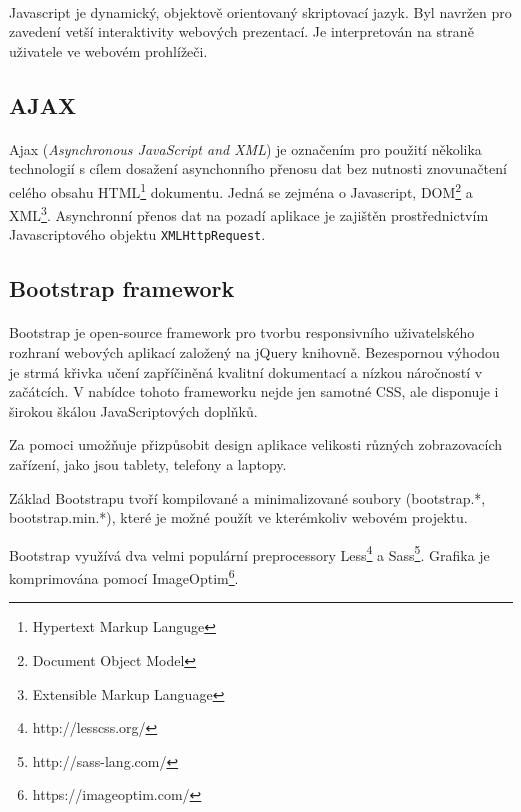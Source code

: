 \documentclass[11pt,oneside]{fithesis}
\begin{document}
        \paragraph*{}
        Javascript je dynamický, objektově orientovaný skriptovací jazyk. Byl navržen pro zavedení vetší interaktivity webových prezentací. Je interpretován na straně uživatele ve webovém prohlížeči.

        \subsection{AJAX}
        \paragraph*{}
        Ajax (\textit{Asynchronous JavaScript and XML}) je označením pro použití několika technologií s cílem dosažení asynchonního přenosu dat bez nutnosti znovunačtení celého obsahu HTML\footnote{Hypertext Markup Languge} dokumentu. Jedná se zejména o Javascript, DOM\footnote{Document Object Model} a XML\footnote{Extensible Markup Language}. Asynchronní přenos dat na pozadí aplikace je zajištěn prostřednictvím Javascriptového objektu \verb|XMLHttpRequest|.

        \subsection{Bootstrap framework}
        \paragraph*{}
        Bootstrap je open-source framework pro tvorbu responsivního uživatelského rozhraní webových aplikací založený na jQuery knihovně. Bezespornou výhodou je strmá křivka učení zapříčiněná kvalitní dokumentací a nízkou náročností v začátcích. V nabídce tohoto frameworku nejde jen samotné CSS, ale disponuje i širokou škálou JavaScriptových doplňků. 

        Za pomoci  umožňuje přizpůsobit design aplikace velikosti různých zobrazovacích zařízení, jako jsou tablety, telefony a laptopy.

        Základ Bootstrapu tvoří kompilované a minimalizované soubory (bootstrap.*, bootstrap.min.*), které je možné použít ve kterémkoliv webovém projektu. 

        Bootstrap využívá dva velmi populární preprocessory Less\footnote{http://lesscss.org/} a Sass\footnote{http://sass-lang.com/}. Grafika je komprimována pomocí ImageOptim\footnote{https://imageoptim.com/}.
\end{document}
